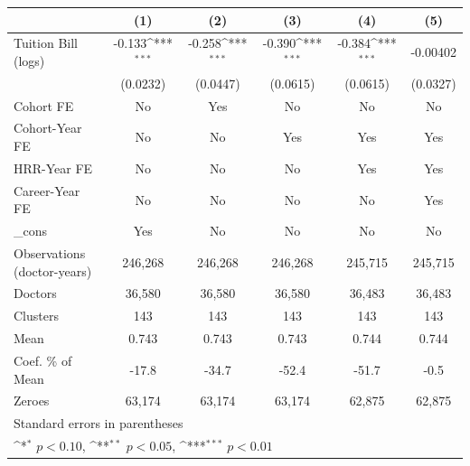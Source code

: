 {
\def\sym#1{\ifmmode^{#1}\else\(^{#1}\)\fi}
\begin{tabular}{l*{5}{c}}
\hline\hline
                    &\multicolumn{1}{c}{(1)}         &\multicolumn{1}{c}{(2)}         &\multicolumn{1}{c}{(3)}         &\multicolumn{1}{c}{(4)}         &\multicolumn{1}{c}{(5)}         \\
\hline
Tuition Bill (logs) &      -0.133\sym{***}&      -0.258\sym{***}&      -0.390\sym{***}&      -0.384\sym{***}&    -0.00402         \\
                    &    (0.0232)         &    (0.0447)         &    (0.0615)         &    (0.0615)         &    (0.0327)         \\
[1em]
Cohort FE           &          No         &         Yes         &          No         &          No         &          No         \\
[1em]
Cohort-Year FE      &          No         &          No         &         Yes         &         Yes         &         Yes         \\
[1em]
HRR-Year FE         &          No         &          No         &          No         &         Yes         &         Yes         \\
[1em]
Career-Year FE      &          No         &          No         &          No         &          No         &         Yes         \\
[1em]
\_cons              &         Yes         &          No         &          No         &          No         &          No         \\
\hline
Observations (doctor-years)&     246,268         &     246,268         &     246,268         &     245,715         &     245,715         \\
Doctors             &      36,580         &      36,580         &      36,580         &      36,483         &      36,483         \\
Clusters            &         143         &         143         &         143         &         143         &         143         \\
Mean                &       0.743         &       0.743         &       0.743         &       0.744         &       0.744         \\
Coef. \% of Mean    &       -17.8         &       -34.7         &       -52.4         &       -51.7         &        -0.5         \\
Zeroes              &      63,174         &      63,174         &      63,174         &      62,875         &      62,875         \\
\hline\hline
\multicolumn{6}{l}{\footnotesize Standard errors in parentheses}\\
\multicolumn{6}{l}{\footnotesize \sym{*} \(p<0.10\), \sym{**} \(p<0.05\), \sym{***} \(p<0.01\)}\\
\end{tabular}
}
